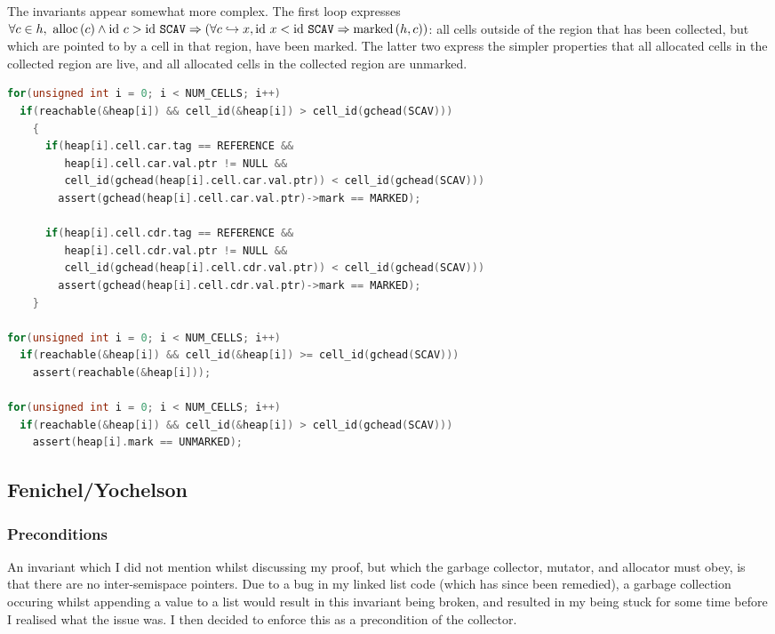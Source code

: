 The invariants appear somewhat more complex. The first loop expresses
$\forall c \in h,\ \mathrm{alloc}\left(c\right) \land \mathrm{id}~c > \mathrm{id}~\mathtt{SCAV} \Rightarrow
(\forall c \hookrightarrow x, \mathrm{id}~x < \mathrm{id}~\mathtt{SCAV} \Rightarrow
\mathrm{marked}\left(h, c\right))$: all cells outside of the region that has been
collected, but which are pointed to by a cell in that region, have
been marked. The latter two express the simpler properties that all
allocated cells in the collected region are live, and all allocated
cells in the collected region are unmarked.

\begin{lstlisting}[language=C,caption={Armstrong/Virding Invariants}]
for(unsigned int i = 0; i < NUM_CELLS; i++)
  if(reachable(&heap[i]) && cell_id(&heap[i]) > cell_id(gchead(SCAV)))
    {
      if(heap[i].cell.car.tag == REFERENCE &&
         heap[i].cell.car.val.ptr != NULL &&
         cell_id(gchead(heap[i].cell.car.val.ptr)) < cell_id(gchead(SCAV)))
        assert(gchead(heap[i].cell.car.val.ptr)->mark == MARKED);

      if(heap[i].cell.cdr.tag == REFERENCE &&
         heap[i].cell.cdr.val.ptr != NULL &&
         cell_id(gchead(heap[i].cell.cdr.val.ptr)) < cell_id(gchead(SCAV)))
        assert(gchead(heap[i].cell.cdr.val.ptr)->mark == MARKED);
    }

for(unsigned int i = 0; i < NUM_CELLS; i++)
  if(reachable(&heap[i]) && cell_id(&heap[i]) >= cell_id(gchead(SCAV)))
    assert(reachable(&heap[i]));

for(unsigned int i = 0; i < NUM_CELLS; i++)
  if(reachable(&heap[i]) && cell_id(&heap[i]) > cell_id(gchead(SCAV)))
    assert(heap[i].mark == UNMARKED);
\end{lstlisting}

\subsection{Fenichel/Yochelson}
\label{sec:results-impl-c}

\subsubsection{Preconditions}
\label{sec:results-impl-c-pre}

An invariant which I did not mention whilst discussing my proof, but
which the garbage collector, mutator, and allocator must obey, is that
there are no inter-semispace pointers. Due to a bug in my linked list
code (which has since been remedied), a garbage collection occuring
whilst appending a value to a list would result in this invariant
being broken, and resulted in my being stuck for some time before I
realised what the issue was. I then decided to enforce this as a
precondition of the collector.

